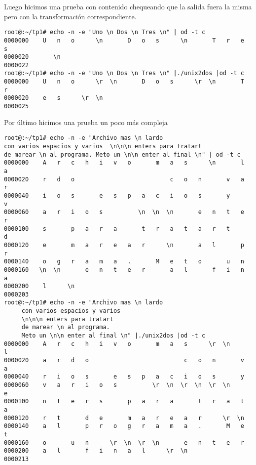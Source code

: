 \documentclass[a4paper,11pt]{article}
\begin{document}
Luego hicimos una prueba con contenido chequeando que la salida fuera la misma pero con la transformaci\'on correspondiente.
\begin{verbatim}
root@:~/tp1# echo -n -e "Uno \n Dos \n Tres \n" | od -t c
0000000    U   n   o      \n       D   o   s      \n       T   r   e   s
0000020       \n                                                        
0000022
root@:~/tp1# echo -n -e "Uno \n Dos \n Tres \n" |./unix2dos |od -t c
0000000    U   n   o      \r  \n       D   o   s      \r  \n       T   r
0000020    e   s      \r  \n                                            
0000025
\end{verbatim}

Por \'ultimo hicimos una prueba un poco m\'as compleja
\begin{verbatim}
root@:~/tp1# echo -n -e "Archivo mas \n lardo    
con varios espacios y varios  \n\n\n enters para tratart 
de marear \n al programa. Meto un \n\n enter al final \n" | od -t c
0000000    A   r   c   h   i   v   o       m   a   s      \n       l   a
0000020    r   d   o                           c   o   n       v   a   r
0000040    i   o   s       e   s   p   a   c   i   o   s       y       v
0000060    a   r   i   o   s          \n  \n  \n       e   n   t   e   r
0000100    s       p   a   r   a       t   r   a   t   a   r   t       d
0000120    e       m   a   r   e   a   r      \n       a   l       p   r
0000140    o   g   r   a   m   a   .       M   e   t   o       u   n    
0000160   \n  \n       e   n   t   e   r       a   l       f   i   n   a
0000200    l      \n                                                    
0000203
root@:~/tp1# echo -n -e "Archivo mas \n lardo 
     con varios espacios y varios  
     \n\n\n enters para tratart 
     de marear \n al programa. 
     Meto un \n\n enter al final \n" |./unix2dos |od -t c
0000000    A   r   c   h   i   v   o       m   a   s      \r  \n       l
0000020    a   r   d   o                           c   o   n       v   a
0000040    r   i   o   s       e   s   p   a   c   i   o   s       y    
0000060    v   a   r   i   o   s          \r  \n  \r  \n  \r  \n       e
0000100    n   t   e   r   s       p   a   r   a       t   r   a   t   a
0000120    r   t       d   e       m   a   r   e   a   r      \r  \n    
0000140    a   l       p   r   o   g   r   a   m   a   .       M   e   t
0000160    o       u   n      \r  \n  \r  \n       e   n   t   e   r    
0000200    a   l       f   i   n   a   l      \r  \n                    
0000213
\end{verbatim}
\end{document}
